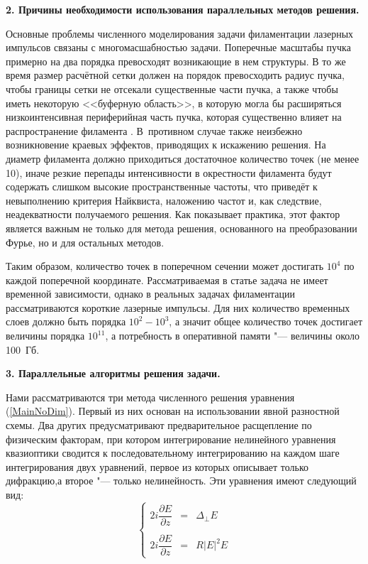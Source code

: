 \vspace{1em}
\noindent \textbf{2. Причины необходимости использования параллельных методов решения.}
\vspace{0.5em}

Основные проблемы численного моделирования задачи филаментации лазерных импульсов связаны с многомасшабностью задачи.
Поперечные масштабы пучка примерно на два порядка превосходят возникающие в нем структуры.
В то же время размер расчётной сетки должен на порядок превосходить радиус пучка, чтобы границы сетки не отсекали существенные части пучка,
а также чтобы иметь некоторую <<буферную область>>, в которую могла бы расширяться низкоинтенсивная периферийная часть пучка,
которая существенно влияет на распространение филамента \cite{KandidovShlenovKosarevaReview2009}.
В~противном случае также неизбежно возникновение краевых эффектов, приводящих к искажению решения.
На диаметр филамента должно приходиться достаточное количество точек (не менее 10), иначе резкие перепады интенсивности в окрестности филамента будут содержать слишком высокие пространственные частоты, что приведёт к невыполнению критерия Найквиста, наложению частот и, как следствие, неадекватности получаемого решения.
Как показывает практика, этот фактор является важным не только для метода решения, основанного на преобразовании Фурье, но и для остальных методов.

Таким образом, количество точек в поперечном сечении может достигать $10^4$ по каждой поперечной координате.
Рассматриваемая в статье задача не имеет временной зависимости, однако в реальных задачах филаментации рассматриваются короткие лазерные импульсы.
Для них количество временных слоев должно быть порядка $10^2-10^3$, а значит общее количество точек достигает величины порядка $10^{11}$,
а потребность в оперативной памяти "--- величины около 100~Гб.


\vspace{1em}
\noindent \textbf{3. Параллельные алгоритмы решения задачи.}
\vspace{0.5em}

Нами рассматриваются три метода численного решения уравнения (\ref{MainNoDim}).
Первый из них основан на использовании явной разностной схемы. Два других предусматривают предварительное расщепление по физическим факторам, при котором
интегрирование нелинейного уравнения квазиоптики сводится к последовательному интегрированию на каждом шаге интегрирования двух уравнений,
первое из которых описывает только дифракцию,а  второе "--- только нелинейность. Эти уравнения имеют следующий вид:
\begin{equation}\label{Split}
    \left\{
    \begin{array}{rcl}
        2i\dfrac{\partial E}{\partial z} & = & \Delta_{\perp}E \\
        \\
        2i\dfrac{\partial E}{\partial z} & = & R\left|E\right|^2E
    \end{array}
    \right.
\end{equation}

